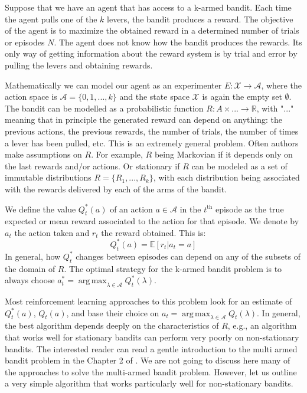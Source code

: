 \documentclass[11pt,a4paper,twoside]{report}
\DeclareMathOperator*{\argmax}{arg\,max}
\newcommand{\+}{\textnormal{+} }
\theoremstyle{definition}
\numberwithin{equation}{chapter}
\begin{document}
Suppose that we have an agent that has access to a k-armed bandit. Each time the
agent pulls one of the $k$ levers, the bandit produces a reward. The objective
of the agent is to maximize the obtained reward in a determined number of trials
or episodes $N$. The agent does not know how the bandit produces the rewards. Its
only way of getting information about the reward system is by trial and error by
pulling the levers and obtaining rewards.

Mathematically we can model our agent as an experimenter
$E:\mathcal{X}\rightarrow\mathcal{A}$, where the action space is
$\mathcal{A}=\{0,1,...,k\}$ and the state space $\mathcal{X}$ is again the empty
set $\emptyset$. The bandit can be modelled as a probabilistic function
$R:A\times ... \rightarrow \mathbb{R}$, with "$...$" meaning that in principle
the generated reward can depend on anything: the previous actions, the previous
rewards, the number of trials, the number of times a lever has been pulled, etc.
This is an extremely general problem. Often authors make assumptions on $R$. For
example, $R$ being Markovian if it depends only on the last rewards and/or actions.
Or stationary if $R$ can be modeled as a set of immutable distributions
$R=\{R_1,... , R_k\}$, with each distribution being associated with the rewards
delivered by each of the arms of the bandit.

We define the value $Q_t^*(a)$ of an action $a \in \mathcal{A}$ in the
$t^\text{th}$ episode as the true expected or mean reward associated to the
action for that episode. We denote by $a_t$ the action taken and $r_t$ the reward
obtained. This is:
\begin{equation}
  Q_t^*(a) = \mathbb{E}[r_t|a_t = a]
\end{equation}
In general, how $Q_t^*$ changes between episodes can depend on any of the subsets
of the domain of $R$. The optimal strategy for the k-armed bandit problem is to
always choose $a_t^*=\argmax_{\lambda \in \mathcal{A}} Q_t^*(\lambda)$.

Most reinforcement learning approaches to this problem look for an estimate of
$Q_t^*(a)$, $Q_t(a)$, and base their choice on $a_t= \argmax_{\lambda \in
\mathcal{A}} Q_t(\lambda)$. In general, the best algorithm depends deeply on the
characteristics of $R$, e.g., an algorithm that works well for stationary
bandits can perform very poorly on non-stationary bandits. The interested reader
can read a gentle introduction to the multi armed bandit problem in the Chapter
2 of \cite{sutton2018reinforcement}. We are not going to discuss here many of
the approaches to solve the multi-armed bandit problem. However, let us outline
a very simple algorithm that works particularly well for non-stationary bandits.
\end{document}
